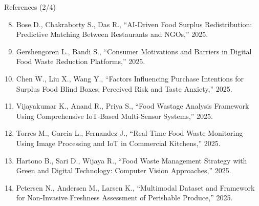 \documentclass[aspectratio=169,xcolor=dvipsnames]{beamer}
\begin{document}
\begin{frame}{References (2/4)}
\tiny
\begin{enumerate}
\setcounter{enumi}{7}
    \item Bose D., Chakraborty S., Das R., ``AI-Driven Food Surplus Redistribution: Predictive Matching Between Restaurants and NGOs,'' 2025.

    \item Gershengoren L., Bandi S., ``Consumer Motivations and Barriers in Digital Food Waste Reduction Platforms,'' 2025.

    \item Chen W., Liu X., Wang Y., ``Factors Influencing Purchase Intentions for Surplus Food Blind Boxes: Perceived Risk and Taste Anxiety,'' 2025.

    \item Vijayakumar K., Anand R., Priya S., ``Food Wastage Analysis Framework Using Comprehensive IoT-Based Multi-Sensor Systems,'' 2025.

    \item Torres M., Garcia L., Fernandez J., ``Real-Time Food Waste Monitoring Using Image Processing and IoT in Commercial Kitchens,'' 2025.

    \item Hartono B., Sari D., Wijaya R., ``Food Waste Management Strategy with Green and Digital Technology: Computer Vision Approaches,'' 2025.

    \item Petersen N., Andersen M., Larsen K., ``Multimodal Dataset and Framework for Non-Invasive Freshness Assessment of Perishable Produce,'' 2025.
\end{enumerate}
\end{frame}
\end{document}
